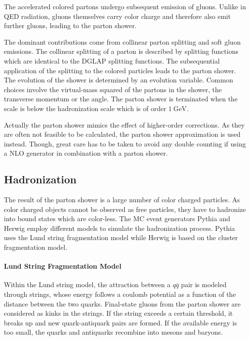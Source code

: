 The accelerated colored partons undergo subsequent emission of gluons. Unlike in
QED radiation, gluons themselves carry color charge and therefore also emit
further gluons, leading to the parton shower. 

The dominant contributions come from collinear parton splitting and soft gluon
emissions. The collinear splitting of a parton is described by splitting
functions which are identical to the DGLAP splitting functions. The
subsequential application of the splitting to the colored particles leads to the
parton shower. The evolution of the shower is determined by an evolution
variable. Common choices involve the virtual-mass squared of the partons in the
shower, the transverse momentum or the angle. The parton shower is terminated
when the scale is below the hadronization scale which is of order $\SI{1}{\GeV}$.

Actually the parton shower mimics the effect of higher-order corrections. As
they are often not feasible to be calculated, the parton shower approximation is
used instead. Though, great care has to be taken to avoid any double counting if
using a NLO generator in combination with a parton shower.

\subsection{Hadronization}

The result of the parton shower is a large number of color charged particles. As
color charged objects cannot be observed as free particles, they have to
hadronize into bound states which are color-less. The MC event generators Pythia
and Herwig employ different models to simulate the hadronization process. Pythia
uses the Lund string fragmentation model while Herwig is based on the cluster
fragmentation model.

\paragraph{Lund String Fragmentation Model}

Within the Lund string model, the attraction between a $q\bar q$ pair is
modeled through strings, whose energy follows a coulomb potential as a function
of the distance between the two quarks. Final-state gluons from the parton
shower are considered as kinks in the strings. If the string exceeds a certain
threshold, it breaks up and new quark-antiquark pairs are formed. If the
available energy is too small, the quarks and antiquarks recombine into mesons
and baryons.

